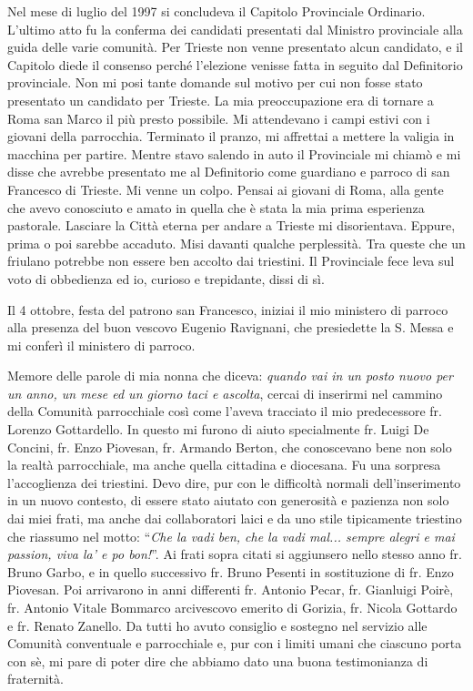 \noindent Nel mese di luglio del 1997 si concludeva il Capitolo Provinciale Ordinario. L’ultimo atto fu la 
conferma dei candidati presentati dal Ministro provinciale alla guida delle varie comunità. Per 
Trieste non venne presentato alcun candidato, e il Capitolo diede il consenso perché l’elezione 
venisse fatta in seguito dal Definitorio provinciale. Non mi posi tante domande sul motivo per 
cui non fosse stato presentato un candidato per Trieste. La mia preoccupazione era di tornare a 
Roma san Marco il più presto possibile. Mi attendevano i campi estivi con i giovani della 
parrocchia. Terminato il pranzo, mi affrettai a mettere la valigia in macchina per partire. Mentre 
stavo salendo in auto il Provinciale mi chiamò e mi disse che avrebbe presentato me al 
Definitorio come guardiano e parroco di san Francesco di Trieste. Mi venne un colpo. Pensai ai 
giovani di Roma, alla gente che avevo conosciuto e amato in quella che è stata la mia prima 
esperienza pastorale. Lasciare la Città eterna per andare a Trieste mi disorientava. Eppure, prima 
o poi sarebbe accaduto. Misi davanti qualche perplessità. Tra queste che un friulano potrebbe 
non essere ben accolto dai triestini. Il Provinciale fece leva sul voto di obbedienza ed io, curioso 
e trepidante, dissi di sì.

Il 4 ottobre, festa del patrono san Francesco, iniziai il mio ministero di parroco alla presenza del 
buon vescovo Eugenio Ravignani, che presiedette la S. Messa e mi conferì il ministero di 
parroco.

Memore delle parole di mia nonna che diceva: \textit{quando vai in un posto nuovo per un anno, un
mese ed un giorno taci e ascolta}, cercai di inserirmi nel cammino della Comunità parrocchiale
così come l’aveva tracciato il mio predecessore fr. Lorenzo Gottardello. In questo mi furono di 
aiuto specialmente fr. Luigi De Concini, fr. Enzo Piovesan, fr. Armando Berton, che 
conoscevano bene non solo la realtà parrocchiale, ma anche quella cittadina e diocesana.
Fu una sorpresa l’accoglienza dei triestini. Devo dire, pur con le difficoltà normali 
dell’inserimento in un nuovo contesto, di essere stato aiutato con generosità e pazienza non solo 
dai miei frati, ma anche dai collaboratori laici e da uno stile tipicamente triestino che riassumo 
nel motto: \enquote{\textit{Che la vadi ben, che la vadi mal... sempre alegri e mai passion, viva la' e po bon!}}.
Ai frati sopra citati si aggiunsero nello stesso anno fr. Bruno Garbo, e in quello successivo fr. 
Bruno Pesenti in sostituzione di fr. Enzo Piovesan. Poi arrivarono in anni differenti fr. Antonio 
Pecar, fr. Gianluigi Poirè, fr. Antonio Vitale Bommarco arcivescovo emerito di Gorizia, fr. 
Nicola Gottardo e fr. Renato Zanello. Da tutti ho avuto consiglio e sostegno nel servizio alle 
Comunità conventuale e parrocchiale e, pur con i limiti umani che ciascuno porta con sè, mi pare 
di poter dire che abbiamo dato una buona testimonianza di fraternità.

